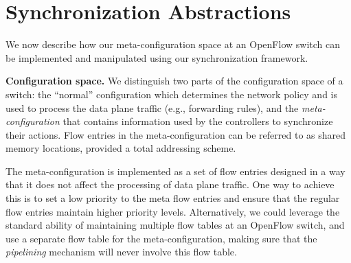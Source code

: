 \documentclass[conference]{sigcomm-alternate}
\begin{document}

%


\section{Synchronization Abstractions}\label{sec:main}

We now describe how our  meta-configuration space at
an OpenFlow switch can be implemented and manipulated using our
synchronization framework.

\vspace{1mm}
\noindent\textbf{Configuration space.}
%
We distinguish two parts of the configuration space of a switch:
the ``normal'' configuration which determines the network policy and
is used to process the data plane traffic (e.g., forwarding rules),
and the \emph{meta-configuration} that contains information used by the
controllers to synchronize their actions.
Flow entries in the meta-configuration can be referred to as shared
memory locations, provided a total addressing scheme.

The meta-configuration is implemented as a set of flow entries
designed in a way that it does not affect the processing of data plane
traffic. One way to achieve this is to set a low priority to
the meta flow entries and ensure that the regular flow entries
maintain higher priority levels.
Alternatively, we could leverage the standard ability of maintaining multiple
flow tables at an OpenFlow switch, and use a separate flow table for
the meta-configuration,  making sure that the
\emph{pipelining} mechanism will never involve this
flow table.
\end{document}
